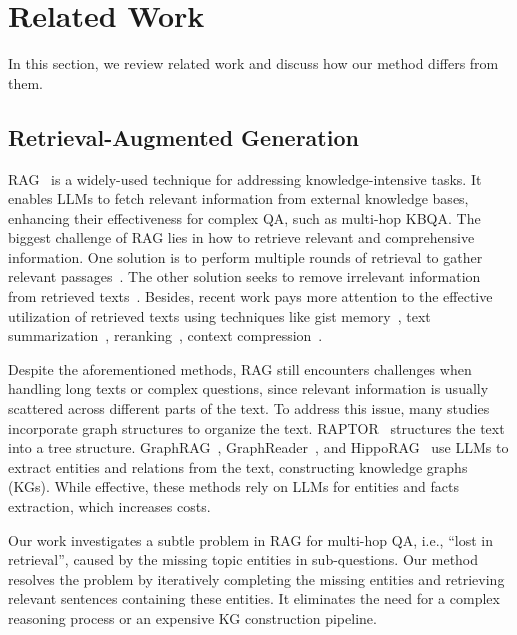 \section{Related Work}
In this section, we review related work and discuss how our method differs from them.

\subsection{Retrieval-Augmented Generation}
RAG~\cite{RAG} is a widely-used technique for addressing knowledge-intensive tasks. 
It enables LLMs to fetch relevant information from external knowledge bases, enhancing their effectiveness for complex QA, such as multi-hop KBQA.
The biggest challenge of RAG lies in how to retrieve relevant and comprehensive information.
One solution is to perform multiple rounds of retrieval to gather relevant passages~\cite{IRCOT,IterRAG23}.
The other solution seeks to remove irrelevant information from retrieved texts~\cite{LongRAG_Jiang}. 
Besides, recent work pays more attention to the effective utilization of retrieved texts using techniques like
gist memory~\cite{GIST},
text summarization~\cite{ReCOMP}, 
reranking~\cite{R2G,CoRAG}, 
context compression~\cite{flexrag}.

Despite the aforementioned methods, RAG still encounters challenges when handling long texts or complex questions, since relevant information is usually scattered across different parts of the text.
To address this issue, many studies incorporate graph structures to organize the text. 
RAPTOR~\cite{raptor} structures the text into a tree structure.
GraphRAG~\cite{graphrag}, GraphReader~\cite{graphreader}, and HippoRAG~\cite{HippoRAG} use LLMs to extract entities and relations from the text, constructing knowledge graphs (KGs). 
While effective, these methods rely on LLMs for entities and facts extraction, which increases costs.

Our work investigates a subtle problem in RAG for multi-hop QA, i.e., ``lost in retrieval'', caused by the missing topic entities in sub-questions.
Our method resolves the problem by iteratively completing the missing entities and retrieving relevant sentences containing these entities.
It eliminates the need for a complex reasoning process or an expensive KG construction pipeline.

